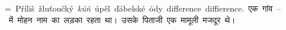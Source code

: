 \documentclass{article}
\begin{document}

=\hbox{
Příliš žluťoučký \textit{kůň} úpěl \hbox{ďábelské} ódy difference diffierence.
\devanagarifam एक गांव -- में मोहन नाम का लड़का रहता था। उसके पिताजी एक मामूली मजदूर थे।}


\end{document}
